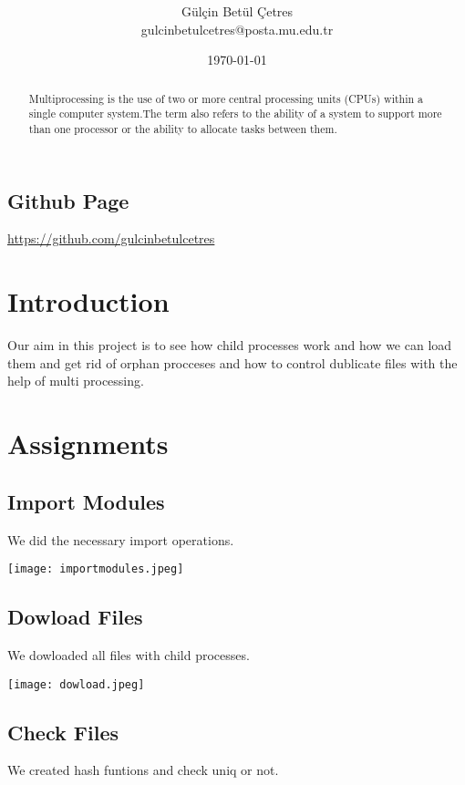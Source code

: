 \documentclass[onecolumn]{article}
\title{\spacecaps{Assignment Report 1: Process and Thread Implementation}\\ \normalsize \spacesc{CENG2034, Operating Systems} }
\author{Gülçin Betül Çetres\\gulcinbetulcetres@posta.mu.edu.tr}
\date{\today}
\begin{document}
\maketitle

\begin{abstract}
Multiprocessing is the use of two or more central processing units (CPUs) within a single computer system.The term also refers to the ability of a system to support more than one processor or the ability to allocate tasks between them.

\end{abstract}
\subsection*{Github Page}
\url{https://github.com/gulcinbetulcetres} 

\section{Introduction}
Our aim in this project is to see how child processes work and how we can load them and get rid of orphan procceses and how to control dublicate files with the help of multi processing.

\section{Assignments}

\subsection{Import Modules}

We did the necessary import operations.

\texttt{[image: importmodules.jpeg]}

\subsection{Dowload Files}

We dowloaded all files with child processes.

\texttt{[image: dowload.jpeg]}

\subsection{Check Files}

We created hash funtions and check uniq or not.
\end{document}
